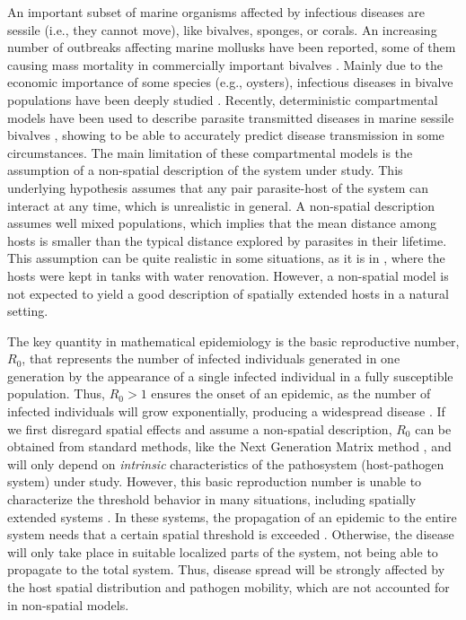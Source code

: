 An important subset of marine organisms affected by infectious diseases are
sessile (i.e., they cannot move), like bivalves, sponges, or corals. An
increasing number of outbreaks affecting marine mollusks have been reported,
some of them causing mass mortality in commercially important bivalves
\cite{Guo2016}. Mainly due to the economic importance of some species (e.g.,
oysters), infectious diseases in bivalve populations have been deeply studied
\cite{Petton2021, Pernet2018, McLaughlin2005, powell1999modeling}. Recently,
deterministic compartmental models have been used to describe parasite
transmitted diseases in marine sessile bivalves \cite{BIDEGAIN_2016_2,
    BIDEGAIN_perkinsus, GimenezRomero2021}, showing to be able to accurately
predict disease transmission in some circumstances. The main limitation of
these compartmental models is the assumption of a non-spatial description of
the system under study. This underlying hypothesis assumes that any pair
parasite-host of the system can interact at any time, which is unrealistic in
general. A non-spatial description assumes well mixed populations, which
implies that the mean distance among hosts is smaller than the typical
distance explored by parasites in their lifetime. This assumption can be quite
realistic in some situations, as it is in \cite{GimenezRomero2021}, where the
hosts were kept in tanks with water renovation. However, a non-spatial model is
not expected to yield a good description of spatially extended hosts in a
natural setting.

The key quantity in mathematical epidemiology is the basic reproductive number,
$R_0$, that represents the number of infected individuals generated in one
generation by the appearance of a single infected individual in a fully
susceptible population. Thus, $R_0>1$ ensures the onset of an epidemic, as the
number of infected individuals will grow exponentially, producing a widespread
disease \cite{Anderson1991}. If we first disregard spatial effects and assume a
non-spatial description, $R_0$ can be obtained from standard methods, like the
Next Generation Matrix method \cite{Diekmann2010}, and will only depend on
\textit{intrinsic} characteristics of the pathosystem (host-pathogen system)
under study. However, this basic reproduction number is unable to characterize
the threshold behavior in many situations, including spatially extended
systems \cite{Cross2007, Li2011, RILEY201568}. In these systems, the
propagation of an epidemic to the entire system needs that a certain spatial
threshold is exceeded \cite{Gilligan2008}. Otherwise, the disease will only
take
place in suitable localized parts of the system, not being able to propagate to
the total system. Thus, disease spread will be strongly affected by the host
spatial distribution and pathogen mobility, which are not accounted for in
non-spatial models.

